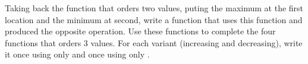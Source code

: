 \label{l4:contract-modularity-ex-order-3}


Taking back the function  that orders two values,
puting the maximum at the first location and the minimum at second, 
write a function  that uses this function and
produced the opposite operation. Use these functions to complete the
four functions that orders 3 values. For each variant (increasing and
decreasing), write it once using only  and once
using only .



